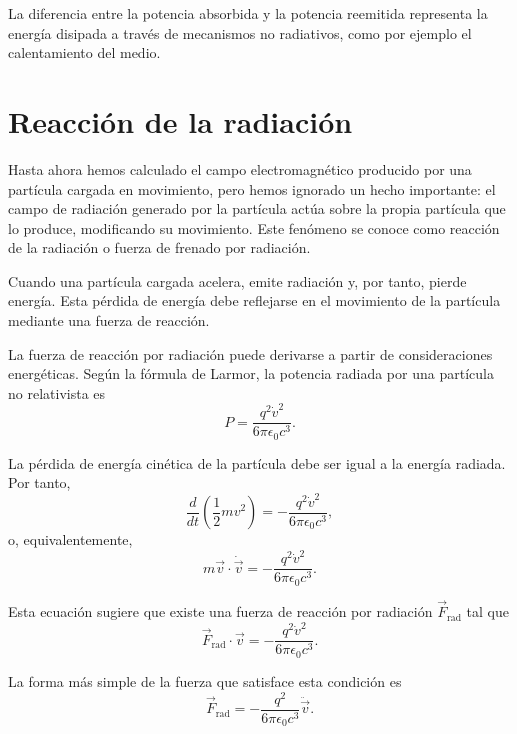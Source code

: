 \documentclass[12pt,a4paper]{book}
\begin{document}
La diferencia entre la potencia absorbida y la potencia reemitida representa la energía disipada a través de mecanismos no radiativos, como por ejemplo el calentamiento del medio.

\section{Reacción de la radiación}

Hasta ahora hemos calculado el campo electromagnético producido por una partícula cargada en movimiento, pero hemos ignorado un hecho importante: el campo de radiación generado por la partícula actúa sobre la propia partícula que lo produce, modificando su movimiento. Este fenómeno se conoce como reacción de la radiación o fuerza de frenado por radiación.

Cuando una partícula cargada acelera, emite radiación y, por tanto, pierde energía. Esta pérdida de energía debe reflejarse en el movimiento de la partícula mediante una fuerza de reacción.

La fuerza de reacción por radiación puede derivarse a partir de consideraciones energéticas. Según la fórmula de Larmor, la potencia radiada por una partícula no relativista es
\begin{equation}
P = \frac{q^2\dot{v}^2}{6\pi\epsilon_0c^3}.
\end{equation}

La pérdida de energía cinética de la partícula debe ser igual a la energía radiada. Por tanto,
\begin{equation}
\frac{d}{dt}\left(\frac{1}{2}mv^2\right) = -\frac{q^2\dot{v}^2}{6\pi\epsilon_0c^3},
\end{equation}
o, equivalentemente,
\begin{equation}
m\vec{v} \cdot \dot{\vec{v}} = -\frac{q^2\dot{v}^2}{6\pi\epsilon_0c^3}.
\end{equation}

Esta ecuación sugiere que existe una fuerza de reacción por radiación $\vec{F}_{\text{rad}}$ tal que
\begin{equation}
\vec{F}_{\text{rad}} \cdot \vec{v} = -\frac{q^2\dot{v}^2}{6\pi\epsilon_0c^3}.
\end{equation}

La forma más simple de la fuerza que satisface esta condición es
\begin{equation}
\vec{F}_{\text{rad}} = -\frac{q^2}{6\pi\epsilon_0c^3}\ddot{\vec{v}}.
\end{equation}
\end{document}
